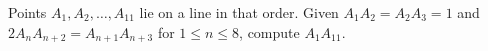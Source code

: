 Points $A_1,A_2,\dots,A_{11}$ lie on a line in that order. Given $A_1A_2=A_2A_3=1$ and $2A_nA_{n+2}=A_{n+1}A_{n+3}$ for $1\le n\le8$, compute $A_1A_{11}$.
